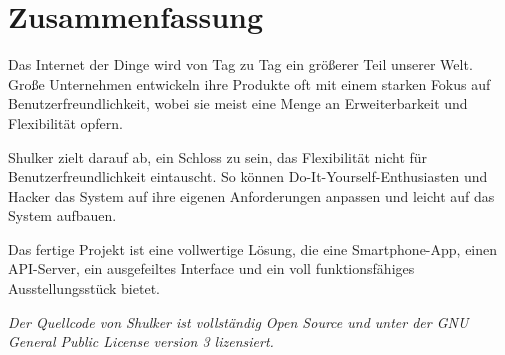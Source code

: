 \section*{Zusammenfassung}

Das Internet der Dinge wird von Tag zu Tag ein größerer Teil unserer Welt. Große Unternehmen entwickeln ihre Produkte oft mit einem starken Fokus auf Benutzerfreundlichkeit, wobei sie meist eine Menge an Erweiterbarkeit und Flexibilität opfern.

Shulker zielt darauf ab, ein Schloss zu sein, das Flexibilität nicht für Benutzerfreundlichkeit eintauscht. So können Do-It-Yourself-Enthusiasten und Hacker das System auf ihre eigenen Anforderungen anpassen und leicht auf das System aufbauen.

Das fertige Projekt ist eine vollwertige Lösung, die eine Smartphone-App, einen API-Server, ein ausgefeiltes Interface und ein voll funktionsfähiges Ausstellungsstück bietet.

\textit{Der Quellcode von Shulker ist vollständig Open Source und unter der GNU General Public License version 3 lizensiert.}

\newpage